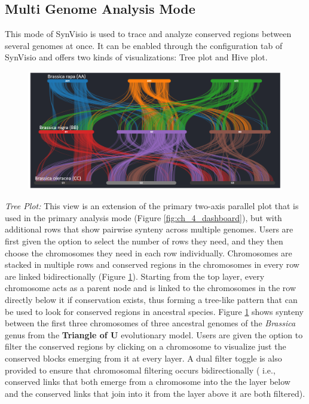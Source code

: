 \subsection{Multi Genome Analysis Mode}
This mode of SynVisio is used to trace and analyze conserved regions between several genomes at once. It can be enabled through the configuration tab of SynVisio and offers two kinds of visualizations: Tree plot and Hive plot.

\begin{figure}
  \centering
  \includegraphics[width=1\linewidth]{images/ch_5_tree_plot.PNG}
  \label{fig:ch_5_tree_plot}
\end{figure} 

\textit{Tree Plot:} This view is an extension of the primary two-axis parallel plot that is used in the primary analysis mode (Figure \ref{fig:ch_4_dashboard}), but with additional rows that show pairwise synteny across multiple genomes. Users are first given the option to select the number of rows they need, and they then choose the chromosomes they need in each row individually. Chromosomes are stacked in multiple rows and conserved regions in the chromosomes in every row are linked bidirectionally (Figure \ref{fig:ch_5_tree_plot}). Starting from the top layer, every chromosome acts as a parent node and is linked to the chromosomes in the row directly below it if conservation exists, thus forming a tree-like pattern that can be used to look for conserved regions in ancestral species. Figure \ref{fig:ch_5_tree_plot} shows synteny between the first three chromosomes of three ancestral genomes of the \textit{Brassica} genus from the \textbf{Triangle of U} evolutionary model\cite{cheng2014genome}. Users are given the option to filter the conserved regions by clicking on a chromosome to visualize just the conserved blocks emerging from it at every layer. A dual filter toggle is also provided to ensure that chromosomal filtering occurs bidirectionally ( i.e., conserved links that both emerge from a chromosome into the the layer below and the conserved links that join into it from the layer above it are both filtered).

